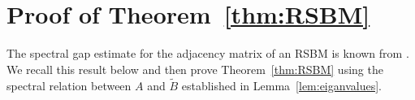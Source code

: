 \documentclass[11pt,reqno]{amsart}
\theoremstyle{definition}
\begin{document}



\section{Proof of Theorem~\ref{thm:RSBM}}\label{sec:proof_RSBM}

{The spectral gap estimate for the adjacency matrix of an RSBM is known from \cite{brito2016recovery}. We recall this result below and then prove Theorem~\ref{thm:RSBM} using the spectral relation between $A$ and $\widetilde B$ established in Lemma~\ref{lem:eiganvalues}.}
\end{document}
